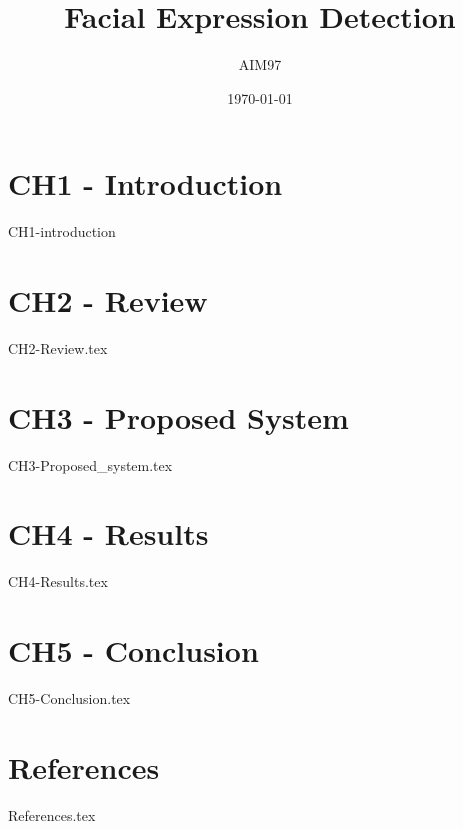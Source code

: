 \documentclass[a4paper]{book}
\title{Facial Expression Detection}
\author{AIM97}
\date{\today}
\begin{document}
	\maketitle
	\tableofcontents
	
	\chapter{CH1 - Introduction}
	{CH1-introduction}
	
	\chapter{CH2 - Review}
	{CH2-Review.tex}
	
	\chapter{CH3 - Proposed System}
	{CH3-Proposed_system.tex}
	
	\chapter{CH4 - Results}
	{CH4-Results.tex}
	
	\chapter{CH5 - Conclusion}
	{CH5-Conclusion.tex}
	
	\chapter{References}
	{References.tex}
	
\end{document}
